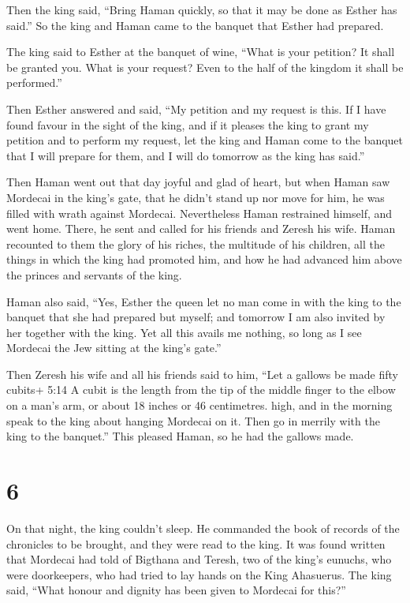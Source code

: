  Then the king said, ``Bring Haman quickly, so that it may
be done as Esther has said.'' So the king and Haman came to the banquet
that Esther had prepared.

 The king said to Esther at the banquet of wine, ``What is
your petition? It shall be granted you. What is your request? Even to
the half of the kingdom it shall be performed.''

 Then Esther answered and said, ``My petition and my request
is this.  If I have found favour in the sight of the king,
and if it pleases the king to grant my petition and to perform my
request, let the king and Haman come to the banquet that I will prepare
for them, and I will do tomorrow as the king has said.''

 Then Haman went out that day joyful and glad of heart, but
when Haman saw Mordecai in the king's gate, that he didn't stand up nor
move for him, he was filled with wrath against Mordecai. 
Nevertheless Haman restrained himself, and went home. There, he sent and
called for his friends and Zeresh his wife.  Haman
recounted to them the glory of his riches, the multitude of his
children, all the things in which the king had promoted him, and how he
had advanced him above the princes and servants of the king.

 Haman also said, ``Yes, Esther the queen let no man come
in with the king to the banquet that she had prepared but myself; and
tomorrow I am also invited by her together with the king. 
Yet all this avails me nothing, so long as I see Mordecai the Jew
sitting at the king's gate.''

 Then Zeresh his wife and all his friends said to him,
``Let a gallows be made fifty cubits+ 5:14 A cubit is the length from
the tip of the middle finger to the elbow on a man's arm, or about 18
inches or 46 centimetres. high, and in the morning speak to the king
about hanging Mordecai on it. Then go in merrily with the king to the
banquet.'' This pleased Haman, so he had the gallows made.

\hypertarget{section-5}{%
\section{6}\label{section-5}}

 On that night, the king couldn't sleep. He commanded the
book of records of the chronicles to be brought, and they were read to
the king.  It was found written that Mordecai had told of
Bigthana and Teresh, two of the king's eunuchs, who were doorkeepers,
who had tried to lay hands on the King Ahasuerus.  The king
said, ``What honour and dignity has been given to Mordecai for this?''


